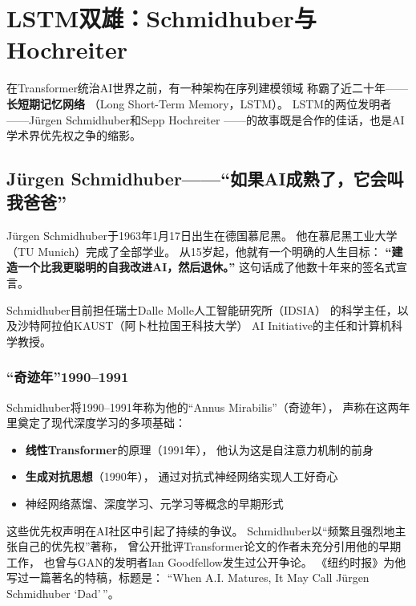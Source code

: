 \section{LSTM双雄：Schmidhuber与Hochreiter}
\label{sec:lstm-duo}

在Transformer统治AI世界之前，有一种架构在序列建模领域
称霸了近二十年——\textbf{长短期记忆网络}
（Long Short-Term Memory，LSTM）。
LSTM的两位发明者——J\"{u}rgen Schmidhuber和Sepp Hochreiter
——的故事既是合作的佳话，也是AI学术界优先权之争的缩影。


\subsection{J\"{u}rgen Schmidhuber——``如果AI成熟了，它会叫我爸爸''}
\label{sec:schmidhuber}

J\"{u}rgen Schmidhuber于1963年1月17日出生在德国慕尼黑。
他在慕尼黑工业大学（TU Munich）完成了全部学业。
从15岁起，他就有一个明确的人生目标：
\textbf{``建造一个比我更聪明的自我改进AI，然后退休。''}
这句话成了他数十年来的签名式宣言。

Schmidhuber目前担任瑞士Dalle Molle人工智能研究所（IDSIA）
的科学主任，以及沙特阿拉伯KAUST（阿卜杜拉国王科技大学）
AI Initiative的主任和计算机科学教授。

\subsubsection{``奇迹年''1990--1991}
Schmidhuber将1990--1991年称为他的``Annus Mirabilis''（奇迹年），
声称在这两年里奠定了现代深度学习的多项基础：
\begin{itemize}[noitemsep]
  \item \textbf{线性Transformer}的原理（1991年），
    他认为这是自注意力机制的前身
  \item \textbf{生成对抗思想}（1990年），
    通过对抗式神经网络实现人工好奇心
  \item 神经网络蒸馏、深度学习、元学习等概念的早期形式
\end{itemize}

这些优先权声明在AI社区中引起了持续的争议。
Schmidhuber以``频繁且强烈地主张自己的优先权''著称，
曾公开批评Transformer论文的作者未充分引用他的早期工作，
也曾与GAN的发明者Ian Goodfellow发生过公开争论。
《纽约时报》为他写过一篇著名的特稿，标题是：
``When A.I. Matures, It May Call J\"{u}rgen Schmidhuber `Dad'\,''。

